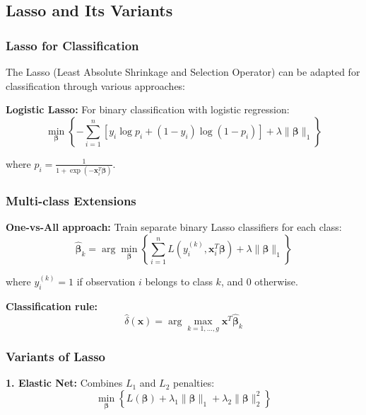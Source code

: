 \documentclass[12pt,a4paper]{article}
\begin{document}
\subsection{Lasso and Its Variants}

\subsubsection{Lasso for Classification}

The Lasso (Least Absolute Shrinkage and Selection Operator) can be adapted for classification through various approaches:

\textbf{Logistic Lasso:} For binary classification with logistic regression:
\begin{equation}
\min_{\boldsymbol{\beta}} \left\{ -\sum_{i=1}^n \left[ y_i \log p_i + (1-y_i) \log(1-p_i) \right] + \lambda \|\boldsymbol{\beta}\|_1 \right\}
\end{equation}

where $p_i = \frac{1}{1 + \exp(-\mathbf{x}_i^T \boldsymbol{\beta})}$.

\subsubsection{Multi-class Extensions}

\textbf{One-vs-All approach:} Train separate binary Lasso classifiers for each class:
\begin{equation}
\hat{\boldsymbol{\beta}}_k = \arg\min_{\boldsymbol{\beta}} \left\{ \sum_{i=1}^n L(y_i^{(k)}, \mathbf{x}_i^T \boldsymbol{\beta}) + \lambda \|\boldsymbol{\beta}\|_1 \right\}
\end{equation}

where $y_i^{(k)} = 1$ if observation $i$ belongs to class $k$, and $0$ otherwise.

\textbf{Classification rule:}
\begin{equation}
\hat{\delta}(\mathbf{x}) = \arg\max_{k=1,\ldots,g} \mathbf{x}^T \hat{\boldsymbol{\beta}}_k
\end{equation}

\subsubsection{Variants of Lasso}

\textbf{1. Elastic Net:} Combines $L_1$ and $L_2$ penalties:
\begin{equation}
\min_{\boldsymbol{\beta}} \left\{ L(\boldsymbol{\beta}) + \lambda_1 \|\boldsymbol{\beta}\|_1 + \lambda_2 \|\boldsymbol{\beta}\|_2^2 \right\}
\end{equation}
\end{document}
